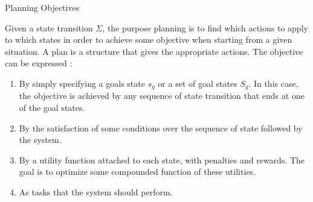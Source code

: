 \documentclass[9pt]{beamer}
\begin{document}
\begin{frame}{Planning Objectives}
\begin{small}

Given a state transition $\Sigma$, the purpose planning is to find \textcolor{CS-1light}{which actions} to apply to \textcolor{CS-1light}{which states} in order to achieve \textcolor{CS-1light}{some objective} when starting from a given situation. A plan is a structure that gives the appropriate actions. \textcolor{CS-1light}{The objective}  can be expressed : 
\begin{enumerate}
\item By simply specifying a \textcolor{CS-1light}{goals state} $s_g$ or a set of goal states $S_g$. In this case, the objective is achieved by any sequence of state transition that ends at one of the goal states.
\item By \textcolor{CS-1light}{the satisfaction of some conditions} over the sequence of state followed by the system.
\item By \textcolor{CS-1light}{a utility function} attached to \textcolor{CS-1light}{each state}, with \textcolor{CS-1light}{penalties and rewards}. The goal is to optimize some compounded function of these utilities.
\item As \textcolor{CS-1light}{tasks} that the system should perform.
\end{enumerate}

\end{small}
\end{frame}
\end{document}

